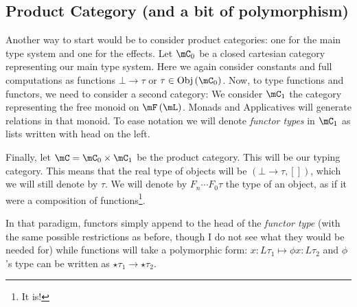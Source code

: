 \documentclass[math, english, info]{cours}
\begin{document}
\subsection{Product Category (and a bit of polymorphism)}
Another way to start would be to consider product categories: one for the main type system and one for the effects.
Let $\mC_{0}$ be a closed cartesian category representing our main type system.
Here we again consider constants and full computations as functions $\bot \to \tau$ or $\tau \in \mathrm{Obj}\left( \mC_{0} \right)$.
Now, to type functions and functors, we need to consider a second category:
We consider $\mC_{1}$ the category representing the free monoid on $\mF\left( \mL \right)$.
Monads and Applicatives will generate relations in that monoid.
To ease notation we will denote \emph{functor types} in $\mC_{1}$ as lists written with head on the left.

Finally, let $\mC = \mC_{0} \times \mC_{1}$ be the product category. This will be our typing category.
This means that the real type of objects will be $\left( \bot \to \tau, [] \right)$, which we will still denote by $\tau$.
We will denote by $F_{n} \cdots F_{0} \tau$ the type of an object, as if it were a composition of functions\footnote{It is!}.

In that paradigm, functors simply append to the head of the \emph{functor type} (with the same possible restrictions as before, though I do not see what they would be needed for) while functions will take a polymorphic form:
$x: L\tau_{1} \mapsto \phi x: L\tau_{2}$ and $\phi$'s type can be written as $\star\tau_{1} \to \star\tau_{2}$.
\end{document}

